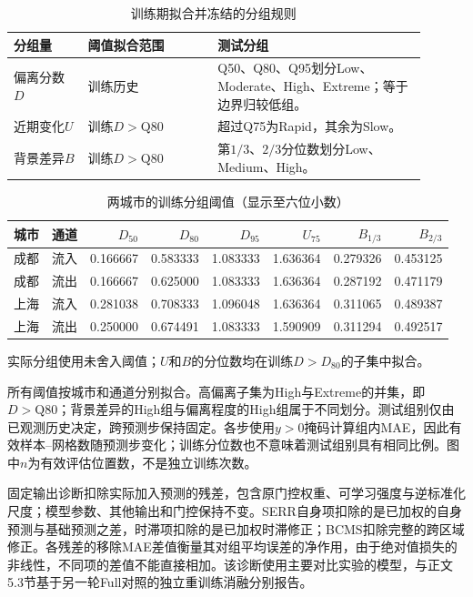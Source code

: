 \documentclass[UTF8,a4paper,zihao=-4,fontset=fandol]{ctexart}
\begin{document}
\begin{table}[!htbp]
\centering\small
\caption{训练期拟合并冻结的分组规则}
\begin{tabular}{p{0.16\linewidth}p{0.29\linewidth}p{0.45\linewidth}}
\toprule
分组量 & 阈值拟合范围 & 测试分组 \\
\midrule
偏离分数\(D\) & 训练历史 & Q50、Q80、Q95划分Low、Moderate、High、Extreme；等于边界归较低组。\\
近期变化\(U\) & 训练\(D>\mathrm{Q80}\) & 超过Q75为Rapid，其余为Slow。\\
背景差异\(B\) & 训练\(D>\mathrm{Q80}\) & 第\(1/3\)、\(2/3\)分位数划分Low、Medium、High。\\
\bottomrule
\end{tabular}
\end{table}


\begin{table}[!htbp]
\centering\footnotesize
\caption{两城市的训练分组阈值（显示至六位小数）}
\setlength{\tabcolsep}{4pt}
\begin{tabular}{llrrrrrr}
\toprule
城市 & 通道 & \(D_{50}\) & \(D_{80}\) & \(D_{95}\) & \(U_{75}\) & \(B_{1/3}\) & \(B_{2/3}\) \\
\midrule
成都 & 流入 & 0.166667 & 0.583333 & 1.083333 & 1.636364 & 0.279326 & 0.453125 \\
成都 & 流出 & 0.166667 & 0.625000 & 1.083333 & 1.636364 & 0.287192 & 0.471179 \\
上海 & 流入 & 0.281038 & 0.708333 & 1.096048 & 1.636364 & 0.311065 & 0.489387 \\
上海 & 流出 & 0.250000 & 0.674491 & 1.083333 & 1.590909 & 0.311294 & 0.492517 \\
\bottomrule
\end{tabular}
\par\smallskip\footnotesize 实际分组使用未舍入阈值；\(U\)和\(B\)的分位数均在训练\(D>D_{80}\)的子集中拟合。
\end{table}

所有阈值按城市和通道分别拟合。高偏离子集为High与Extreme的并集，即\(D>\mathrm{Q80}\)；背景差异的High组与偏离程度的High组属于不同划分。测试组别仅由已观测历史决定，跨预测步保持固定。各步使用\(y>0\)掩码计算组内MAE，因此有效样本--网格数随预测步变化；训练分位数也不意味着测试组别具有相同比例。图中\(n\)为有效评估位置数，不是独立训练次数。

固定输出诊断扣除实际加入预测的残差，包含原门控权重、可学习强度与逆标准化尺度；模型参数、其他输出和门控保持不变。SERR自身项扣除的是已加权的自身预测与基础预测之差，时滞项扣除的是已加权时滞修正；BCMS扣除完整的跨区域修正。各残差的移除MAE差值衡量其对组平均误差的净作用，由于绝对值损失的非线性，不同项的差值不能直接相加。该诊断使用主要对比实验的模型，与正文5.3节基于另一轮Full对照的独立重训练消融分别报告。
\end{document}
